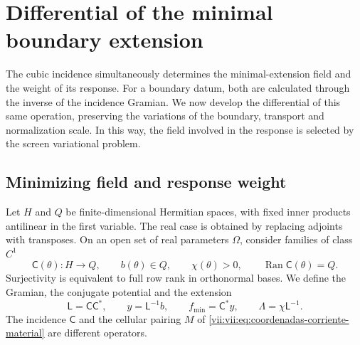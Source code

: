 
\section{Differential of the minimal boundary extension}
\label{vii:vii:sec:corriente-extension-minima}

The cubic incidence simultaneously determines the minimal-extension field and the weight of its response. For a boundary datum, both are calculated through the inverse of the incidence Gramian. We now develop the differential of this same operation, preserving the variations of the boundary, transport and normalization scale. In this way, the field involved in the response is selected by the screen variational problem.

\subsection{Minimizing field and response weight}
\label{vii:vii:subsec:extension-minima-parametrizada}

Let \(H\) and \(Q\) be finite-dimensional Hermitian spaces, with
fixed inner products antilinear in the first variable. The real case is
obtained by replacing adjoints with transposes. On an open set of
real parameters \(\Omega\), consider families of class \(C^1\)
\[
 \mathsf C(\theta):H\longrightarrow Q,\qquad
 b(\theta)\in Q,\qquad \chi(\theta)>0,
 \qquad \operatorname{Ran}\mathsf C(\theta)=Q.
\]
Surjectivity is equivalent to full row rank in orthonormal bases. We define the Gramian, the conjugate potential and the extension
\begin{equation}
 \mathsf L=\mathsf C\mathsf C^*,\qquad
 y=\mathsf L^{-1}b,\qquad f_{\min}=\mathsf C^*y,
 \qquad \Lambda=\chi\mathsf L^{-1}.
 \label{vii:vii:eq:gramiano-extension-minima}
\end{equation}
The incidence \(\mathsf C\) and the cellular pairing \(M\) of \eqref{vii:vii:eq:coordenadas-corriente-material} are different operators.

